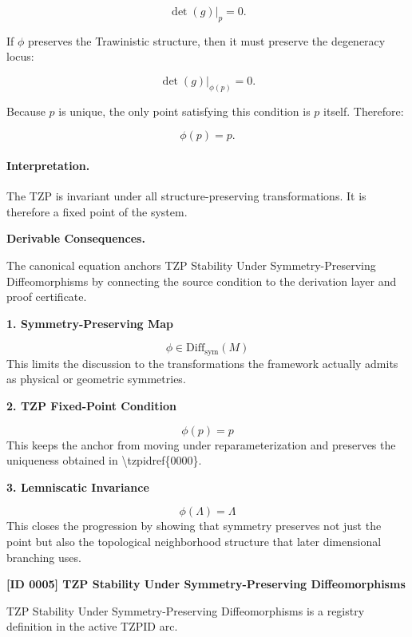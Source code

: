 \begin{equation}
\det(g)\big|_p=0 .
\end{equation}

If $\phi$ preserves the Trawinistic structure, then it must preserve the degeneracy locus:

\begin{equation}
\det(g)\big|_{\phi(p)}=0 .
\end{equation}

Because $p$ is unique, the only point satisfying this condition is $p$ itself. Therefore:

\begin{equation}
\phi(p)=p .
\end{equation}

\paragraph{Interpretation.}
The TZP is invariant under all structure-preserving transformations. It is therefore a fixed point of the system.

\par\vspace{0.35em}
\noindent\textbf{Derivable Consequences.}\quad
\begingroup
\footnotesize
\raggedright
The canonical equation anchors TZP Stability Under Symmetry-Preserving Diffeomorphisms by connecting the source condition to the derivation layer and proof certificate.
\par\endgroup

\noindent\textbf{1. Symmetry-Preserving Map}\par
\[
\phi \in \mathrm{Diff}_{\mathrm{sym}}(M)
\]
\noindent This limits the discussion to the transformations the framework actually admits as physical or geometric symmetries.\par
\noindent\textbf{2. TZP Fixed-Point Condition}\par
\[
\phi(p)=p
\]
\noindent This keeps the anchor from moving under reparameterization and preserves the uniqueness obtained in \textbackslash{}tzpidref\{0000\}.\par
\noindent\textbf{3. Lemniscatic Invariance}\par
\[
\phi(\Lambda)=\Lambda
\]
\noindent This closes the progression by showing that symmetry preserves not just the point but also the topological neighborhood structure that later dimensional branching uses.\par

\clearpage
\noindent\textbf{[ID 0005] TZP Stability Under Symmetry-Preserving Diffeomorphisms}\par
\vspace{0.35em}
\begingroup\small
{}
TZP Stability Under Symmetry-Preserving Diffeomorphisms is a registry definition in the active TZPID arc.

